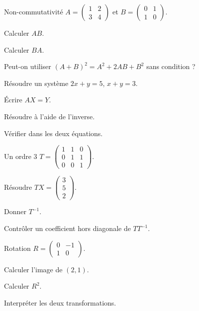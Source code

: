 \clearpage
{}
\begingroup\renewcommand{\otBesoinPlace}[1]{}\begin{minipage}{\linewidth}
\begin{exercice}[2]{Non-commutativité}
$A=\begin{pmatrix}1&2\\3&4\end{pmatrix}$ et $B=\begin{pmatrix}0&1\\1&0\end{pmatrix}$.
\begin{questions}
\item Calculer $AB$.
\item Calculer $BA$.
\item Peut-on utiliser $(A+B)^2=A^2+2AB+B^2$ sans condition ?
\end{questions}
\end{exercice}
\begin{exercice}[2]{Résoudre un système}
$2x+y=5$, $x+y=3$.
\begin{questions}
\item Écrire $AX=Y$.
\item Résoudre à l’aide de l’inverse.
\item Vérifier dans les deux équations.
\end{questions}
\end{exercice}
\begin{exercice}[2]{Un ordre $3$}
$T=\begin{pmatrix}1&1&0\\0&1&1\\0&0&1\end{pmatrix}$.
\begin{questions}
\item Résoudre $TX=\begin{pmatrix}3\\5\\2\end{pmatrix}$.
\item Donner $T^{-1}$.
\item Contrôler un coefficient hors diagonale de $TT^{-1}$.
\end{questions}
\end{exercice}
\begin{exercice}[2]{Rotation}
$R=\begin{pmatrix}0&-1\\1&0\end{pmatrix}$.
\begin{questions}
\item Calculer l’image de $(2,1)$.
\item Calculer $R^2$.
\item Interpréter les deux transformations.
\end{questions}
\end{exercice}
\end{minipage}\endgroup
